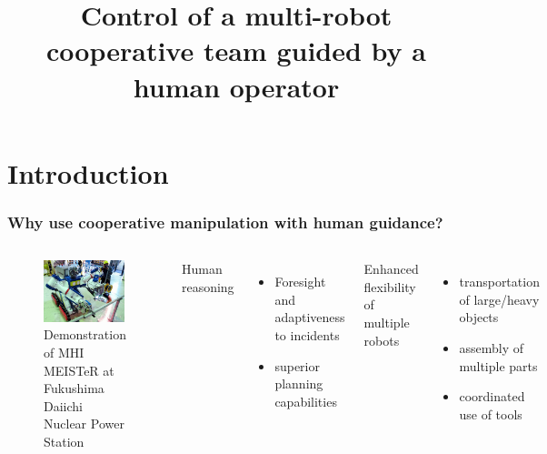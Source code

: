 \documentclass[student]{ITRslides}
\title{Control of a multi-robot cooperative team guided by a human operator}
\begin{document}
\begin{frame}
    \titlepage
\end{frame}


\section{Introduction}

\begin{frame}
	\frametitle{Why use cooperative manipulation with human guidance?}
		\begin{columns}
			\begin{figure}[htb]
			\centering
			\includegraphics[width=0.98\textwidth]{mhi-meister45.jpg}
			\caption{Demonstration of MHI MEISTeR at 						Fukushima Daiichi 					Nuclear 						Power Station\cite{}}
			\end{figure} 
		Human reasoning
		\begin{itemize}
			\item Foresight and adaptiveness to incidents
			\item superior planning capabilities
		\end{itemize}
		Enhanced flexibility of multiple robots
			\begin{itemize}
				\item transportation of large/heavy objects
	\item assembly of multiple parts 
	\item coordinated use of tools
			\end{itemize}
			\end{columns}
\end{frame}
\end{document}
